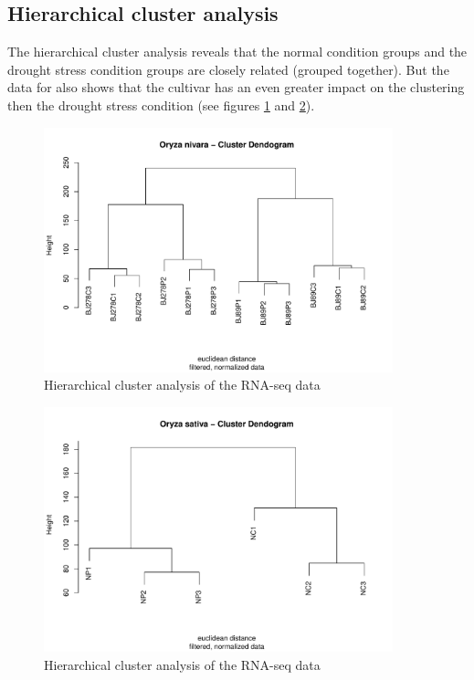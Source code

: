 \subsection{Hierarchical cluster analysis}

The hierarchical cluster analysis reveals that the normal condition groups and the drought stress condition groups are closely related (grouped together). But the data for  also shows that the cultivar has an even greater impact on the clustering then the drought stress condition (see figures \ref{fig:3.1-Clust-Dendrogram-Oryza_nivara} and \ref{fig:3.1-Clust-Dendrogram-Oryza_sativa}).

\begin{figure}[htbp]
    \caption{Hierarchical cluster analysis of the  RNA-seq data}
    \label{fig:3.1-Clust-Dendrogram-Oryza_nivara}
    \includegraphics[width=0.9\textwidth]{../../results/plots-and-tables/3.1-Clust-Dendrogram-Oryza_nivara}
\end{figure}

\begin{figure}[htbp]
    \caption{Hierarchical cluster analysis of the  RNA-seq data}
    \label{fig:3.1-Clust-Dendrogram-Oryza_sativa}
    \includegraphics[width=0.9\textwidth]{../../results/plots-and-tables/3.1-Clust-Dendrogram-Oryza_sativa}
\end{figure}


